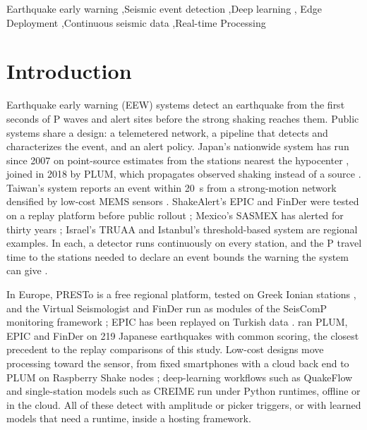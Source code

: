 \documentclass[a4paper,fleqn]{cas-sc}
\begin{document}
\begin{keywords}
  Earthquake early warning \sep Seismic event detection \sep Deep learning \sep
  Edge Deployment \sep Continuous seismic data \sep Real-time Processing
\end{keywords}

\maketitle

\doublespacing

\section{Introduction}\label{sec:intro}

Earthquake early warning (EEW) systems detect an earthquake from the first seconds
of P waves and alert sites before the strong shaking reaches them. Public systems
share a design: a telemetered network, a pipeline that detects and characterizes the
event, and an alert policy. Japan's nationwide system has run since 2007 on
point-source estimates from the stations nearest the hypocenter \citep{hoshiba2008},
joined in 2018 by PLUM, which propagates observed shaking instead of a source
\citep{kodera2020}. Taiwan's system reports an event within 20~s from a strong-motion
network \citep{hsiao2009} densified by low-cost MEMS sensors \citep{wu2013}.
ShakeAlert's EPIC and FinDer were tested on a replay platform before public rollout
\citep{kohler2018,cochran2018,chung2019,kohler2020}; Mexico's SASMEX has alerted for
thirty years \citep{suarez2022}; Israel's TRUAA \citep{nof2021} and Istanbul's
threshold-based system \citep{alcik2009} are regional examples. In each, a detector
runs continuously on every station, and the P travel time to the stations needed to
declare an event bounds the warning the system can give \citep{allen2009}.

In Europe, PRESTo \citep{zollo2009} is a free regional platform, tested on Greek
Ionian stations \citep{bracale2021}, and the Virtual Seismologist and FinDer run as
modules of the SeisComP monitoring framework \citep{behr2016,massin2021,porras2021};
EPIC has been replayed on Turkish data \citep{tunc2024,marcou2025,budakoglu2026}.
\citet{meier2020} ran PLUM, EPIC and FinDer on 219 Japanese earthquakes with common
scoring, the closest precedent to the replay comparisons of this study. Low-cost
designs move processing toward the sensor, from fixed smartphones with a cloud back
end \citep{brooks2021} to PLUM on Raspberry Shake nodes \citep{prasanna2022};
deep-learning workflows such as QuakeFlow \citep{zhu2023} and single-station models
such as CREIME \citep{chakraborty2022} run under Python runtimes, offline or in the
cloud. All of these detect with amplitude or picker triggers, or with learned models
that need a runtime, inside a hosting framework.
\end{document}
